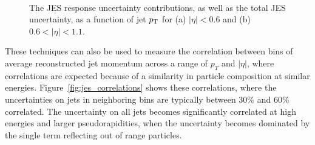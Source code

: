 \begin{figure}[ht]
\centering
{} \\
\caption{ The \ac{JES} response uncertainty contributions, as well as the total \ac{JES} uncertainty, as a function of jet $p_{\mathrm{T}}$ for (a) $|\eta| < 0.6$ and (b) $0.6 < |\eta| < 1.1$.}
\label{fig:jes_uncertainty}
\end{figure}

These techniques can also be used to measure the correlation between bins of average reconstructed jet momentum across a range of $p_T$ and $|\eta|$, where correlations are expected because of a similarity in particle composition at similar energies.
Figure~\ref{fig:jes_correlations} shows these correlations, where the uncertainties on jets in neighboring bins are typically between 30\% and 60\% correlated. 
The uncertainty on all jets becomes significantly correlated at high energies and larger pseudorapidities, when the uncertainty becomes dominated by the single term reflecting out of range particles.

